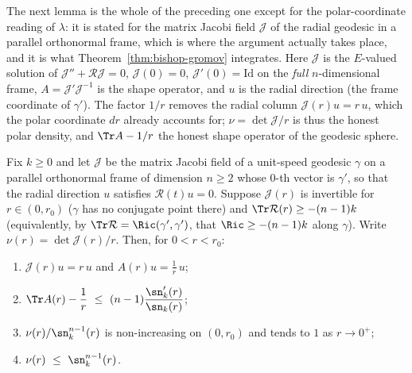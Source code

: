The next lemma is the whole of the preceding one except for the
polar-coordinate reading of $\lambda$: it is stated for the matrix Jacobi
field $\mathcal J$ of the radial geodesic in a parallel orthonormal frame,
which is where the argument actually takes place, and it is what
Theorem~\ref{thm:bishop-gromov} integrates. Here $\mathcal J$ is the
$E$-valued solution of $\mathcal J''+\mathcal R\mathcal J=0$,
$\mathcal J(0)=0$, $\mathcal J'(0)=\mathrm{Id}$ on the \emph{full}
$n$-dimensional frame, $A=\mathcal J'\mathcal J^{-1}$ is the shape operator,
and $u$ is the radial direction (the frame coordinate of $\gamma'$). The
factor $1/r$ removes the radial column $\mathcal J(r)u=r\,u$, which the polar
coordinate $dr$ already accounts for; $\nu=\det\mathcal J/r$ is thus the
honest polar density, and $\Tr A-1/r$ the honest shape operator of the
geodesic sphere.

\begin{lemma}
\label{lem:frame-volume-comparison}
\leanok



Fix $k\ge0$ and let $\mathcal J$ be the matrix Jacobi field of a unit-speed
geodesic $\gamma$ on a parallel orthonormal frame of dimension $n\ge2$ whose
$0$-th vector is $\gamma'$, so that the radial direction $u$ satisfies
$\mathcal R(t)u=0$. Suppose $\mathcal J(r)$ is invertible for $r\in(0,r_0)$
($\gamma$ has no conjugate point there) and $\Tr\mathcal R(r)\ge-(n-1)k$
(equivalently, by $\Tr\mathcal R=\Ric(\gamma',\gamma')$, that
$\Ric\ge-(n-1)k$ along $\gamma$). Write $\nu(r)=\det\mathcal J(r)/r$. Then,
for $0<r<r_0$:
\begin{enumerate}
\item $\mathcal J(r)u=r\,u$ and $A(r)u=\tfrac1r\,u$;
\item $\Tr A(r)-\dfrac1r\ \le\ (n-1)\dfrac{\sn_k'(r)}{\sn_k(r)}$;
\item $\nu(r)/\sn_k^{n-1}(r)$ is non-increasing on $(0,r_0)$ and tends to $1$
as $r\to0^+$;
\item $\nu(r)\ \le\ \sn_k^{n-1}(r)$.
\end{enumerate}
\end{lemma}

